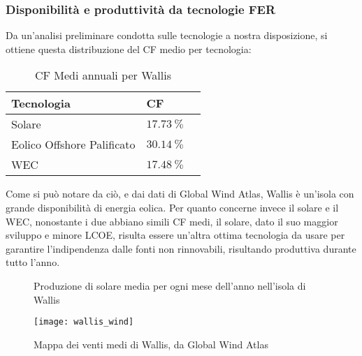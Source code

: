 \documentclass[fleqn,11pt]{SelfArx} %
\begin{document}
\subsubsection{Disponibilità e produttività da tecnologie FER}
Da un'analisi preliminare condotta sulle tecnologie a nostra disposizione, si ottiene questa distribuzione del CF medio per tecnologia: 

\begin{table}[H]
	\caption{CF Medi annuali per Wallis}
	\centering
	\begin{tabular}{llc}
		\toprule
		Tecnologia   & CF \\
		\midrule
		Solare       & \(\SI{17.73}{\percent}\)         \\
		Eolico Offshore Palificato & \(\SI{30.14}{\percent}\)          \\
		WEC          & \(\SI{17.48}{\percent}\)         \\
		\bottomrule
	\end{tabular}
	\label{tab:wallis_cf}
\end{table}

Come si può notare da ciò, e dai dati di Global Wind Atlas, Wallis è un'isola con grande disponibilità di energia eolica.
Per quanto concerne invece il solare e il WEC, nonostante i due abbiano simili CF medi, il solare, dato il suo maggior sviluppo e minore LCOE, risulta essere un'altra ottima tecnologia da usare per garantire l'indipendenza dalle fonti non rinnovabili, risultando produttiva durante tutto l'anno.

\begin{figure}[H]\centering
	\caption{Produzione di solare media per ogni mese dell'anno nell'isola di Wallis}
	\label{fig:monthly_solar_wallis}
\end{figure}

\begin{figure}[ht]\centering
	\texttt{[image: wallis\_wind]}
	\caption{Mappa dei venti medi di Wallis, da Global Wind Atlas}
	\label{fig:wind_wallis}
\end{figure}
\end{document}
